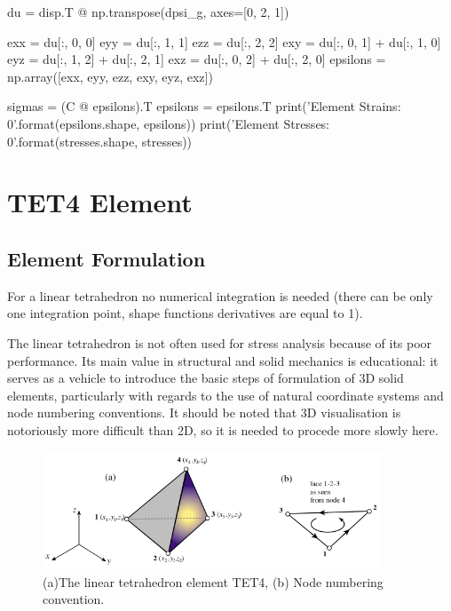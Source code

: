 \begin{python}
    du = disp.T @ np.transpose(dpsi_g, axes=[0, 2, 1])

    exx = du[:, 0, 0]
    eyy = du[:, 1, 1]
    ezz = du[:, 2, 2]
    exy = du[:, 0, 1] + du[:, 1, 0]
    eyz = du[:, 1, 2] + du[:, 2, 1]
    exz = du[:, 0, 2] + du[:, 2, 0]
    epsilons = np.array([exx, eyy, ezz, exy, eyz, exz])

    sigmas = (C @ epsilons).T
    epsilons = epsilons.T
    print('Element Strains: {0}'.format(epsilons.shape, epsilons))
    print('Element Stresses: {0}'.format(stresses.shape, stresses))
\end{python}




\newpage
\section{TET4 Element}

\subsection{Element Formulation}
For a linear tetrahedron no numerical integration is needed (there can be only
one integration point, shape functions derivatives are equal to 1).

The linear tetrahedron is not often used for stress analysis because of its poor
performance. Its main value in structural and solid mechanics is educational:
it serves as a vehicle to introduce the basic steps of formulation of 3D solid elements,
particularly with regards to the use of natural coordinate systems and node numbering
conventions. It should be noted that 3D visualisation is notoriously more difficult
than 2D, so it is needed to procede more slowly here.

\begin{figure}[ht]
    \centering
    \includegraphics[width=0.90\textwidth]{img/linear_tetrahedron.png}
    \caption{(a)The linear tetrahedron element TET4, (b) Node numbering convention.}
    \label{fig:linear-tetrahedron-png}
\end{figure}


